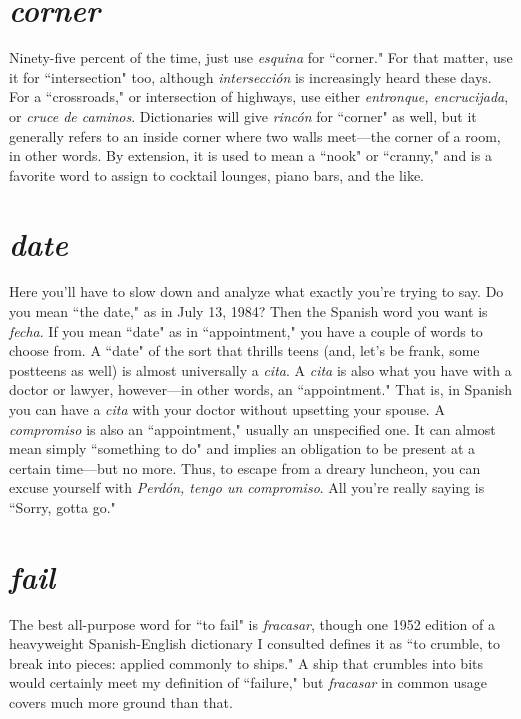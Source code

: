 \section{\emph{corner}}

Ninety-five percent of the time, just use \emph{esquina} for ``corner."
For that matter, use it for ``intersection" too, although \emph{intersección}
is increasingly heard these days. For a ``crossroads," or intersection
of highways, use either \emph{entronque, encrucijada}, or \emph{cruce de caminos}.
Dictionaries will give \emph{rincón} for ``corner" as well, but it generally refers to an inside corner where two walls meet---the corner of a room,
in other words. By extension, it is used to mean a ``nook" or ``cranny,"
and is a favorite word to assign to cocktail lounges, piano bars, and
the like.

\section{\emph{date}}

Here you'll have to slow down and analyze what exactly you're
trying to say. Do you mean ``the date," as in July 13, 1984? Then the
Spanish word you want is \emph{fecha}. If you mean ``date" as in ``appointment," you have a couple of words to choose from. A ``date" of the sort
that thrills teens (and, let's be frank, some postteens as well) is almost
universally a \emph{cita}. A \emph{cita} is also what you have with a doctor or lawyer, however---in other words, an ``appointment." That is, in Spanish
you can have a \emph{cita} with your doctor without upsetting your spouse. A
\emph{compromiso} is also an ``appointment," usually an unspecified one. It
can almost mean simply ``something to do" and implies an obligation
to be present at a certain time---but no more. Thus, to escape from a
dreary luncheon, you can excuse yourself with \emph{Perdón, tengo un compromiso}. All you're really saying is ``Sorry, gotta go."

\section{\emph{fail}}

The best all-purpose word for ``to fail" is \emph{fracasar}, though one
1952 edition of a heavyweight Spanish-English dictionary I consulted
defines it as ``to crumble, to break into pieces: applied commonly to
ships." A ship that crumbles into bits would certainly meet my definition of ``failure," but \emph{fracasar} in common usage covers
much more
ground than that.

